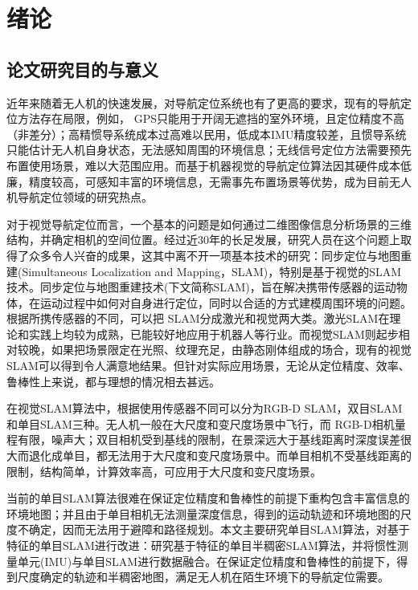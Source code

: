 
\chapter{绪论}
\label{chap:intro}

\section{论文研究目的与意义}
近年来随着无人机的快速发展，对导航定位系统也有了更高的要求，现有的导航定位方法存在局限，例如， GPS只能用于开阔无遮挡的室外环境，且定位精度不高（非差分）；高精惯导系统成本过高难以民用，低成本IMU精度较差，且惯导系统只能估计无人机自身状态，无法感知周围的环境信息；无线信号定位方法需要预先布置使用场景，难以大范围应用。而基于机器视觉的导航定位算法因其硬件成本低廉，精度较高，可感知丰富的环境信息，无需事先布置场景等优势，成为目前无人机导航定位领域的研究热点。

对于视觉导航定位而言，一个基本的问题是如何通过二维图像信息分析场景的三维结构，并确定相机的空间位置\upcite{[1.1]}。经过近30年的长足发展，研究人员在这个问题上取得了众多令人兴奋的成果，这其中离不开一项基本技术的研究：同步定位与地图重建(Simultaneous Localization and Mapping，SLAM)，特别是基于视觉的SLAM技术。同步定位与地图重建技术(下文简称SLAM)，旨在解决携带传感器的运动物体，在运动过程中如何对自身进行定位，同时以合适的方式建模周围环境的问题\upcite{[1.2]}。根据所携传感器的不同，可以把 SLAM分成激光和视觉两大类。激光SLAM在理论和实践上均较为成熟，已能较好地应用于机器人等行业。而视觉SLAM则起步相对较晚，如果把场景限定在光照、纹理充足，由静态刚体组成的场合，现有的视觉SLAM可以得到令人满意地结果。但针对实际应用场景，无论从定位精度、效率、鲁棒性上来说，都与理想的情况相去甚远。

在视觉SLAM算法中，根据使用传感器不同可以分为RGB-D SLAM，双目SLAM和单目SLAM三种\upcite{[1.3]}。无人机一般在大尺度和变尺度场景中飞行，而 RGB-D相机量程有限，噪声大；双目相机受到基线的限制，在景深远大于基线距离时深度误差很大而退化成单目，都无法用于大尺度和变尺度场景中。而单目相机不受基线距离的限制，结构简单，计算效率高，可应用于大尺度和变尺度场景。

当前的单目SLAM算法很难在保证定位精度和鲁棒性的前提下重构包含丰富信息的环境地图；并且由于单目相机无法测量深度信息，得到的运动轨迹和环境地图的尺度不确定，因而无法用于避障和路径规划。本文主要研究单目SLAM算法，对基于特征的单目SLAM进行改进：研究基于特征的单目半稠密SLAM算法，并将惯性测量单元(IMU)与单目SLAM进行数据融合。在保证定位精度和鲁棒性的前提下，得到尺度确定的轨迹和半稠密地图，满足无人机在陌生环境下的导航定位需要。

